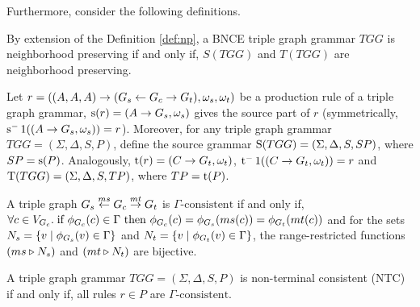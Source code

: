 \documentclass[]{report}
\begin{document}
Furthermore, consider the following definitions.

\begin{definition}
	By extension of the Definition \ref{def:np}, a BNCE triple graph grammar $TGG$ is neighborhood preserving if and only if, $S(TGG)$ and $T(TGG)$ are neighborhood preserving.
\end{definition}

\begin{definition}
	\label{def:source}
	Let $r = ((A,A,A) \pro (G_s \ms{} G_c \mt{} G_t), \omega_s, \omega_t)$ be a production rule of a triple graph grammar, $\source(r) = (A \pro G_s,\omega_s)$ gives the source part of $r$ (symmetrically, $\source^-1((A \pro G_s,\omega_s)) = r$). Moreover, for any triple graph grammar $TGG = (\Sigma, \Delta, S, P)$, define the source grammar $\Source(TGG) = (\Sigma, \Delta, S, SP)$, where $SP = \source(P)$. Analogously, $\target(r) = (C \pro G_t,\omega_t)$, $\target^-1((C \pro G_t,\omega_t)) = r$ and $\Target(TGG) = (\Sigma, \Delta, S, TP)$, where $TP = \target(P)$.
\end{definition}

\begin{definition}
	A triple graph $G_s \ms{ms} G_c \mt{mt} G_t$ is $\Gamma\text{-consistent}$ if and only if, 
$\forall c \in V_{G_c} \. \text{if } \phi_{G_c}(c) \in \Gamma \text{ then } \phi_{G_c}(c) = \phi_{G_s}(ms(c)) = \phi_{G_t}(mt(c))$ and for the sets $N_s = \{v \st \phi_{G_s}(v) \in \Gamma\}$ and $N_t = \{v \st \phi_{G_t}(v) \in \Gamma\}$, the range-restricted functions $(ms \rrestr N_s)$ and $(mt \rrestr N_t)$ are bijective.
\end{definition}

\begin{definition}
	A triple graph grammar $TGG = (\Sigma, \Delta, S, P)$ is non-terminal consistent (NTC) if and only if, all rules $r \in P$ are $\Gamma\text{-consistent}$.
\end{definition}
\end{document}
